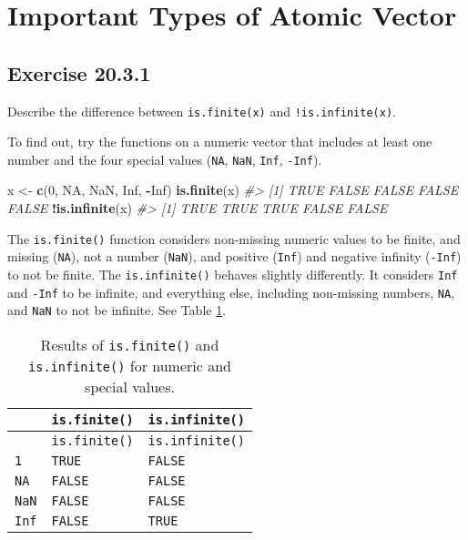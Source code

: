 \documentclass[]{book}
\newenvironment{Shaded}{\begin{snugshade}}{\end{snugshade}}
\newcommand{\CommentTok}[1]{\textcolor[rgb]{0.56,0.35,0.01}{\textit{#1}}}
\newcommand{\DecValTok}[1]{\textcolor[rgb]{0.00,0.00,0.81}{#1}}
\newcommand{\KeywordTok}[1]{\textcolor[rgb]{0.13,0.29,0.53}{\textbf{#1}}}
\newcommand{\NormalTok}[1]{#1}
\newcommand{\OperatorTok}[1]{\textcolor[rgb]{0.81,0.36,0.00}{\textbf{#1}}}
\newcommand{\OtherTok}[1]{\textcolor[rgb]{0.56,0.35,0.01}{#1}}
\newcommand{\StringTok}[1]{\textcolor[rgb]{0.31,0.60,0.02}{#1}}
\theoremstyle{plain}
\theoremstyle{remark}
\theoremstyle{definition}
\theoremstyle{definition}
\theoremstyle{definition}
\theoremstyle{remark}
\begin{document}
\hypertarget{important-types-of-atomic-vector}{%
\section{Important Types of Atomic
Vector}\label{important-types-of-atomic-vector}}

\hypertarget{exercise-20.3.1}{%
\subsection*{\texorpdfstring{Exercise
{20.3.1}}{Exercise 20.3.1}}\label{exercise-20.3.1}}

Describe the difference between \texttt{is.finite(x)} and
\texttt{!is.infinite(x)}.

To find out, try the functions on a numeric vector that includes at
least one number and the four special values (\texttt{NA}, \texttt{NaN},
\texttt{Inf}, \texttt{-Inf}).

\begin{Shaded}
\begin{Highlighting}[]
\NormalTok{x <-}\StringTok{ }\KeywordTok{c}\NormalTok{(}\DecValTok{0}\NormalTok{, }\OtherTok{NA}\NormalTok{, }\OtherTok{NaN}\NormalTok{, }\OtherTok{Inf}\NormalTok{, }\OperatorTok{-}\OtherTok{Inf}\NormalTok{)}
\KeywordTok{is.finite}\NormalTok{(x)}
\CommentTok{#> [1]  TRUE FALSE FALSE FALSE FALSE}
\OperatorTok{!}\KeywordTok{is.infinite}\NormalTok{(x)}
\CommentTok{#> [1]  TRUE  TRUE  TRUE FALSE FALSE}
\end{Highlighting}
\end{Shaded}

The \texttt{is.finite()} function considers non-missing numeric values
to be finite, and missing (\texttt{NA}), not a number (\texttt{NaN}),
and positive (\texttt{Inf}) and negative infinity (\texttt{-Inf}) to not
be finite. The \texttt{is.infinite()} behaves slightly differently. It
considers \texttt{Inf} and \texttt{-Inf} to be infinite, and everything
else, including non-missing numbers, \texttt{NA}, and \texttt{NaN} to
not be infinite. See Table \ref{tab:finite-infinite}.

\begin{longtable}[]{@{}lll@{}}
\caption{\label{tab:finite-infinite} Results of \texttt{is.finite()} and
\texttt{is.infinite()} for numeric and special values.}\tabularnewline
\toprule
& \texttt{is.finite()} & \texttt{is.infinite()}\tabularnewline
\midrule
\endfirsthead
\toprule
& \texttt{is.finite()} & \texttt{is.infinite()}\tabularnewline
\midrule
\endhead
\texttt{1} & \texttt{TRUE} & \texttt{FALSE}\tabularnewline
\texttt{NA} & \texttt{FALSE} & \texttt{FALSE}\tabularnewline
\texttt{NaN} & \texttt{FALSE} & \texttt{FALSE}\tabularnewline
\texttt{Inf} & \texttt{FALSE} & \texttt{TRUE}\tabularnewline
\bottomrule
\end{longtable}
\end{document}
